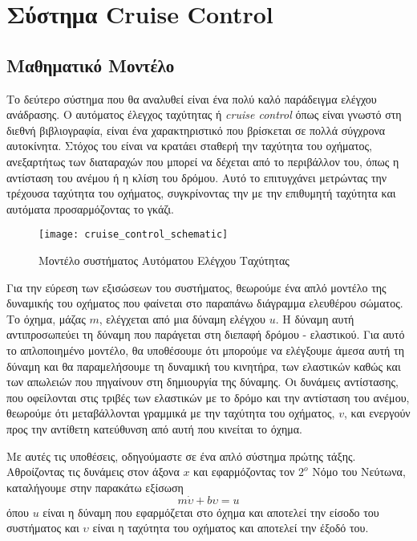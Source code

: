 \section{Σύστημα Cruise Control} \label{sec:cruise_control}

\subsection{Μαθηματικό Μοντέλο}

Το δεύτερο σύστημα που θα αναλυθεί είναι ένα πολύ καλό παράδειγμα ελέγχου ανάδρασης. Ο αυτόματος έλεγχος ταχύτητας ή \emph{cruise control} όπως είναι γνωστό στη διεθνή βιβλιογραφία, είναι ένα χαρακτηριστικό που βρίσκεται σε πολλά σύγχρονα αυτοκίνητα. Στόχος του είναι να κρατάει σταθερή την ταχύτητα του οχήματος, ανεξαρτήτως των διαταραχών που μπορεί να δέχεται από το περιβάλλον του, όπως η αντίσταση του ανέμου ή η κλίση του δρόμου. Αυτό το επιτυγχάνει μετρώντας την τρέχουσα ταχύτητα του οχήματος, συγκρίνοντας την με την επιθυμητή ταχύτητα και αυτόματα προσαρμόζοντας το γκάζι.

\begin{figure}[h]
  \centering
  \texttt{[image: cruise\_control\_schematic]}
  \caption{Μοντέλο συστήματος Αυτόματου Ελέγχου Ταχύτητας}
  \label{fig:cruise_control_schematic}
\end{figure}

Για την εύρεση των εξισώσεων του συστήματος, θεωρούμε ένα απλό μοντέλο της δυναμικής του οχήματος που φαίνεται στο παραπάνω διάγραμμα ελευθέρου σώματος. Το όχημα, μάζας $m$, ελέγχεται από μια δύναμη ελέγχου $u$. Η δύναμη αυτή αντιπροσωπεύει τη δύναμη που παράγεται στη διεπαφή δρόμου - ελαστικού. Για αυτό το απλοποιημένο μοντέλο, θα υποθέσουμε ότι μπορούμε να ελέγξουμε άμεσα αυτή τη δύναμη και θα παραμελήσουμε τη δυναμική του κινητήρα, των ελαστικών καθώς και των απωλειών που πηγαίνουν στη δημιουργία της δύναμης. Οι δυνάμεις αντίστασης, που οφείλονται στις τριβές των ελαστικών με το δρόμο και την αντίσταση του ανέμου, θεωρούμε ότι μεταβάλλονται γραμμικά με την ταχύτητα του οχήματος, $v$, και ενεργούν προς την αντίθετη κατεύθυνση από αυτή που κινείται το όχημα.

Με αυτές τις υποθέσεις, οδηγούμαστε σε ένα απλό σύστημα πρώτης τάξης. Αθροίζοντας τις δυνάμεις στον άξονα $x$ και εφαρμόζοντας τον $2^o$ Νόμο του Νεύτωνα, καταλήγουμε στην παρακάτω εξίσωση
\begin{equation}
m\dot{\upsilon} + b\upsilon = u
\label{eq:cruise_control_ode}
\end{equation}
όπου $u$ είναι η δύναμη που εφαρμόζεται στο όχημα και αποτελεί την είσοδο του συστήματος και $\upsilon$ είναι η ταχύτητα του οχήματος και αποτελεί την έξοδό του.

